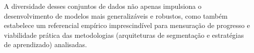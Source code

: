 A diversidade desses conjuntos de dados não apenas impulsiona o desenvolvimento de modelos mais generalizáveis e robustos, como também estabelece um referencial empírico imprescindível para mensuração de progresso e viabilidade prática das metodologias (arquiteturas de segmentação e estratégias de aprendizado) analisadas.

